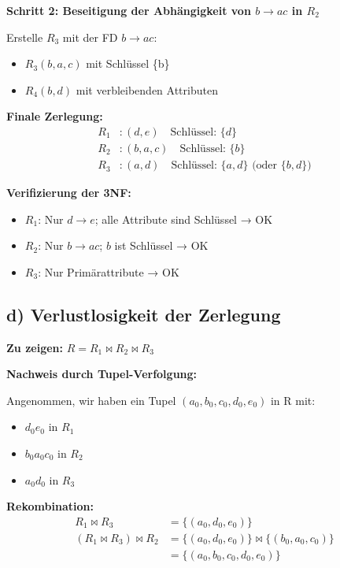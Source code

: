 \documentclass[12pt,a4paper]{article}
\begin{document}
\textbf{Schritt 2: Beseitigung der Abhängigkeit von $b \to ac$ in $R_2$}

Erstelle $R_3$ mit der FD $b \to ac$:
\begin{itemize}
    \item $R_3(b, a, c)$ mit Schlüssel \{b\}
    \item $R_4(b, d)$ mit verbleibenden Attributen
\end{itemize}

\textbf{Finale Zerlegung:}
\begin{align*}
R_1 &: (d, e) \quad \text{Schl\"ussel: } \{d\} \\
R_2 &: (b, a, c) \quad \text{Schl\"ussel: } \{b\} \\
R_3 &: (a, d) \quad \text{Schl\"ussel: } \{a, d\} \text{ (oder } \{b, d\} \text{)}
\end{align*}

\textbf{Verifizierung der 3NF:}
\begin{itemize}
    \item $R_1$: Nur $d \to e$; alle Attribute sind Schlüssel → OK
    \item $R_2$: Nur $b \to ac$; $b$ ist Schlüssel → OK
    \item $R_3$: Nur Primärattribute → OK
\end{itemize}

\subsection*{d) Verlustlosigkeit der Zerlegung}

\textbf{Zu zeigen:} $R = R_1 \bowtie R_2 \bowtie R_3$

\textbf{Nachweis durch Tupel-Verfolgung:}

Angenommen, wir haben ein Tupel $(a_0, b_0, c_0, d_0, e_0)$ in R mit:
\begin{itemize}
    \item $d_0 e_0$ in $R_1$
    \item $b_0 a_0 c_0$ in $R_2$
    \item $a_0 d_0$ in $R_3$
\end{itemize}

\textbf{Rekombination:}
\begin{align*}
R_1 \bowtie R_3 &= \{(a_0, d_0, e_0)\} \\
(R_1 \bowtie R_3) \bowtie R_2 &= \{(a_0, d_0, e_0)\} \bowtie \{(b_0, a_0, c_0)\} \\
&= \{(a_0, b_0, c_0, d_0, e_0)\}
\end{align*}
\end{document}
